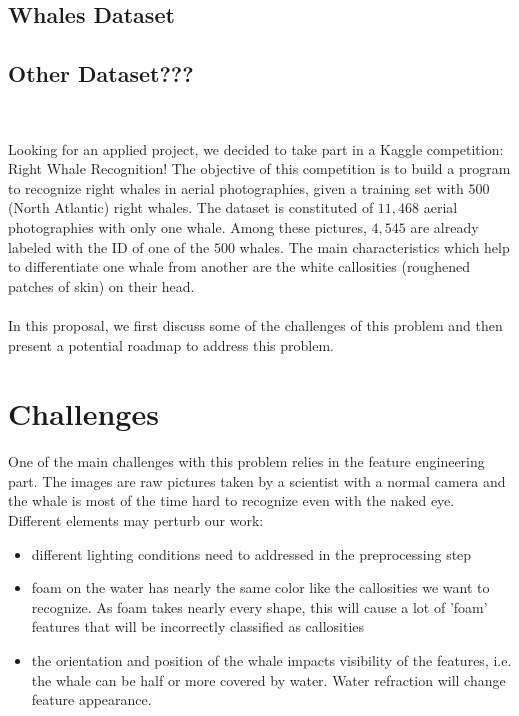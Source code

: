\documentclass[11pt,a4paper,oneside]{article}
\begin{document}
\subsection{Whales Dataset}

\subsection{Other Dataset???}

\

Looking for an applied project, we decided to take part in a Kaggle competition: Right Whale Recognition! The objective of this competition is to build a program to recognize right whales in aerial photographies, given a training set with $500$ (North Atlantic) right whales. The dataset is constituted of $11,468$ aerial photographies with only one whale. Among these pictures, $4,545$ are already labeled with the ID of one of the $500$ whales. The main characteristics which help to differentiate one whale from another are the white callosities (roughened patches of skin) on their head.\\
\\

In this proposal, we first discuss some of the challenges of this problem and then present a potential roadmap to address this problem.


\section*{Challenges}

One of the main challenges with this problem relies in the feature engineering part. The images are raw pictures taken by a scientist with a normal camera and the whale is most of the time hard to recognize even with the naked eye. Different elements may perturb our work:
\begin{itemize}
	\item different lighting conditions need to addressed in the preprocessing step
	\item foam on the water has nearly the same color like the callosities we want to recognize. As foam takes nearly every shape, this will cause a lot of 'foam' features that will be incorrectly classified as callosities
	\item the orientation and position of the whale impacts visibility of the features, i.e. the whale can be half or more covered by water. Water refraction will change feature appearance.
\end{itemize}
\end{document}
